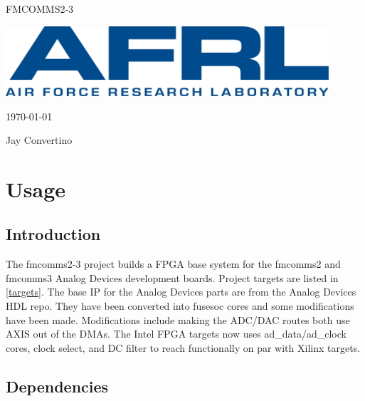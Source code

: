 \begin{titlepage}
  \begin{center}

  {\Huge FMCOMMS2-3}

  \vspace{25mm}

  \includegraphics[width=0.90\textwidth,height=\textheight,keepaspectratio]{img/AFRL.png}

  \vspace{25mm}

  \today

  \vspace{15mm}

  {\Large Jay Convertino}

  \end{center}
\end{titlepage}

\tableofcontents

\newpage

\section{Usage}

\subsection{Introduction}

\par
The fmcomms2-3 project builds a FPGA base system for the fmcomms2 and fmcomms3 Analog Devices development boards.
Project targets are listed in \ref{targets}. The base IP for the Analog Devices parts are from the Analog Devices HDL repo.
They have been converted into fusesoc cores and some modifications have been made. Modifications include making the ADC/DAC
routes both use AXIS out of the DMAs. The Intel FPGA targets now uses ad\_data/ad\_clock cores, clock select, and DC filter
to reach functionally on par with Xilinx targets.

\subsection{Dependencies}

